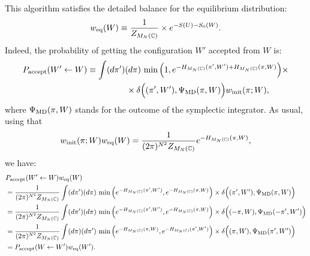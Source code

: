 \documentclass[12pt]{article}
\begin{document}
This algorithm satisfies the detailed balance
for the equilibrium distribution:
\begin{align}
  w_{\rm eq}(W)
  \equiv
  \frac{1}{Z_{M_N(\mathbb{C})}} \times e^{-S(U)-S_0(W)}.
\end{align}
Indeed, the probability of getting the configuration $W'$ accepted
from $W$ is:
\begin{align}
  P_{\rm accept}(W' \leftarrow W)
  &\equiv
    \int(d\pi')(d\pi)\,
    \min \Big(
    1, e^{-H_{M_N(\mathbb{C})}(\pi',W') + H_{M_N(\mathbb{C})}(\pi, W)}
    \Big)\times \\
  & ~~~~~~~~~~~~~~
    \times
    \delta\Big(
    (\pi', W'), \Psi_{\rm MD} (\pi,W)
    \Big)
    w_{\rm init}(\pi;W),
\end{align}
where $\Psi_{\rm MD} (\pi,W)$ stands for the
outcome of the symplectic integrator.
As usual, using that
\begin{align}
  w_{\rm init}(\pi; W) w_{\rm eq}(W)
  =
  \frac{1}{(2\pi)^{N^2}Z_{M_N(\mathbb{C})}}
  e^{-H_{M_N(\mathbb{C})}(\pi, W)},
\end{align}
we have:
\begin{align}
  &
  P_{\rm accept}(W' \leftarrow W)w_{\rm eq}(W) \nonumber\\
  &=
    \frac{1}{(2\pi)^{N^2}Z_{M_N(\mathbb{C})}}
    \int(d\pi')(d\pi)\,
    \min \Big(
    e^{-H_{M_N(\mathbb{C})}(\pi',W')},
    e^{-H_{M_N(\mathbb{C})}(\pi, W)}
    \Big)\times
    \delta\Big(
    (\pi', W'), \Psi_{\rm MD} (\pi,W)
    \Big) \nonumber \\
  &=
    \frac{1}{(2\pi)^{N^2}Z_{M_N(\mathbb{C})}}
    \int(d\pi')(d\pi)\,
    \min \Big(
    e^{-H_{M_N(\mathbb{C})}(\pi',W')},
    e^{-H_{M_N(\mathbb{C})}(\pi, W)}
    \Big)\times
    \delta\Big(
    (-\pi,W), \Psi_{\rm MD}(-\pi', W')
    \Big) \nonumber \\
  &=
    \frac{1}{(2\pi)^{N^2}Z_{M_N(\mathbb{C})}}
    \int(d\pi)(d\pi')\,
    \min \Big(
    e^{-H_{M_N(\mathbb{C})}(\pi, W)},
    e^{-H_{M_N(\mathbb{C})}(\pi',W')}
    \Big)\times
    \delta\Big(
    (\pi,W), \Psi_{\rm MD}(\pi', W')
    \Big) \nonumber \\
  &
    =
    P_{\rm accept}(W \leftarrow W') w_{\rm eq}(W').
\end{align}
\end{document}
